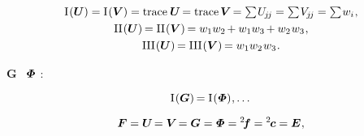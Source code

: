 \nopagebreak\vspace{-0.3em}
\begin{gather*}
\anyfirstinvariantof{\bm{U}}
= \anyfirstinvariantof{\bm{V}}
= \trace{\bm{U}} \hspace{-0.25ex}
= \trace{\hspace{-0.2ex}\bm{V}} \hspace{-0.25ex}
= \textstyle\sum \hspace{-0.2ex} U_{\hspace{-0.2ex}j\hspace{-0.2ex}j}
= \textstyle\sum \hspace{-0.2ex} V_{\hspace{-0.1ex}j\hspace{-0.2ex}j}
= \textstyle\sum \hspace{-0.2ex} w_{i}
\hspace{.1ex} ,
\\
%
\anysecondinvariantof{\bm{U}} \hspace{-0.2ex}
= \anysecondinvariantof{\bm{V}} \hspace{-0.2ex}
= \vphantom{\textstyle\sum}
w_1 w_2 \hspace{-0.2ex}
+ w_1 w_3 \hspace{-0.2ex}
+ w_2 \hspace{.15ex} w_3
\hspace{.1ex} ,
\\
%
\anythirdinvariantof{\bm{U}} \hspace{-0.2ex}
= \anythirdinvariantof{\bm{V}} \hspace{-0.2ex}
= \vphantom{\textstyle\sum}
w_1 w_2 \hspace{.15ex} w_3
\hspace{.1ex} .
\end{gather*}

$\bm{G}$
~$\mathboldPhi$
:

\nopagebreak
\begin{equation*}
\anyfirstinvariantof{\bm{G}}
\hspace{-0.2ex}
= \anyfirstinvariantof{\mathboldPhi}
\hspace{.1ex} , \dots
\end{equation*}


\nopagebreak\vspace{-0.2em}\begin{equation*}
\bm{F} = \bm{U} \hspace{-0.3ex} = \bm{V} \hspace{-0.3ex} = \bm{G} = \mathboldPhi = {^2}\hspace{-0.4ex}\bm{f} = {^2}\hspace{-0.2ex}\bm{c} = \UnitDyad
\hspace{.1ex}
,
\end{equation*}

